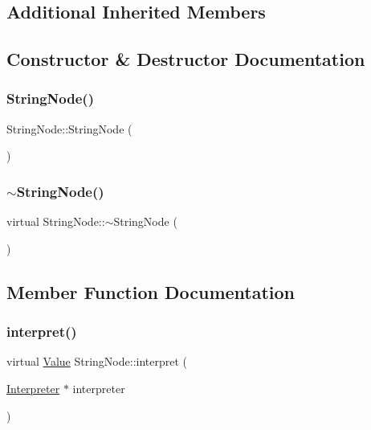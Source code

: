 \subsection*{Additional Inherited Members}


\subsection{Constructor \& Destructor Documentation}
\mbox{\label{classStringNode_a3ac1767041e5519e52ada6e7c5ecbbe4}} 
\subsubsection{\texorpdfstring{String\+Node()}{StringNode()}}
{\footnotesize\ttfamily String\+Node\+::\+String\+Node (\begin{DoxyParamCaption}{ }\end{DoxyParamCaption})}

\mbox{\label{classStringNode_a2b2f8f89db3402822e55da8ede0ca443}} 
\subsubsection{\texorpdfstring{$\sim$\+String\+Node()}{~StringNode()}}
{\footnotesize\ttfamily virtual String\+Node\+::$\sim$\+String\+Node (\begin{DoxyParamCaption}{ }\end{DoxyParamCaption})\hspace{0.3cm}{\ttfamily [virtual]}}



\subsection{Member Function Documentation}
\mbox{\label{classStringNode_ae92c0858cd07baf0c6417f7bdfce9f0d}} 
\subsubsection{\texorpdfstring{interpret()}{interpret()}}
{\footnotesize\ttfamily virtual \hyperlink{classValue}{Value} String\+Node\+::interpret (\begin{DoxyParamCaption}\item[{\hyperlink{classInterpreter}{Interpreter} $\ast$}]{interpreter }\end{DoxyParamCaption})\hspace{0.3cm}{\ttfamily [virtual]}}



